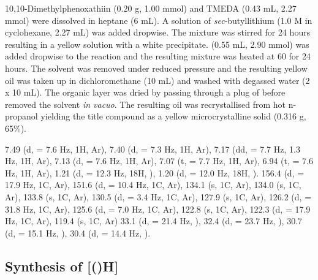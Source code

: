 10,10-Dimethylphenoxathiin (0.20 g, 1.00 mmol) and TMEDA (0.43 mL, 2.27 mmol) were dissolved in heptane (6 mL).  A solution of \emph{sec}-butyllithium (1.0 M in cyclohexane, 2.27 mL) was added dropwise.  The mixture was stirred for 24 hours resulting in a yellow solution with a white precipitate.   (0.55 mL, 2.90 mmol) was added dropwise to the reaction and the resulting mixture was heated at 60 \degC{}  for 24 hours.  The solvent was removed under reduced pressure and the resulting yellow oil was taken up in dichloromethane (10 mL) and washed with degassed water (2 x 10 mL).  The organic layer was dried by passing through a plug of  before removed the solvent \emph{in vacuo}.  The resulting oil was recrystallised from hot n-propanol yielding the title compound as a yellow microcrystalline solid (0.316 g, 65\%).  

7.49 (d, \J = 7.6 Hz, 1H, Ar),
7.40 (d, \J = 7.3 Hz, 1H, Ar),
7.17 (dd, \J = 7.7 Hz, 1.3 Hz, 1H, Ar),
7.13 (d, \J = 7.6 Hz, 1H, Ar),
7.07 (t, \J = 7.7 Hz, 1H, Ar),
6.94 (t, \J = 7.6 Hz, 1H, Ar),
1.21 (d, \J = 12.3 Hz, 18H, \StBuiH),
1.20 (d, \J = 12.0 Hz, 18H, \StBuiH).
156.4 (d, \JPC = 17.9 Hz, 1C, Ar),
151.6 (d, \JPC = 10.4 Hz, 1C, Ar),
134.1 (s, 1C, Ar),
134.0 (s, 1C, Ar),
133.8 (s, 1C, Ar),
130.5 (d, \JPC = 3.4 Hz, 1C, Ar),
127.9 (s, 1C, Ar),
126.2 (d, \JPC = 31.8 Hz, 1C, Ar),
125.6 (d, \JPC = 7.0 Hz, 1C, Ar),
122.8 (s, 1C, Ar),
122.3 (d, \JPC = 17.9 Hz, 1C, Ar),
119.4 (s, 1C, Ar)
33.1 (d, \JPC = 21.4 Hz, \StBuhC),
32.4 (d, \JPC = 23.7 Hz, \StBuhC),
30.7 (d, \JPC = 15.1 Hz, \StBuiC),
30.4 (d, \JPC = 14.4 Hz, \StBuiC).

\subsection*{Synthesis of \texorpdfstring{[(\tBuxantphos)H]} t}




